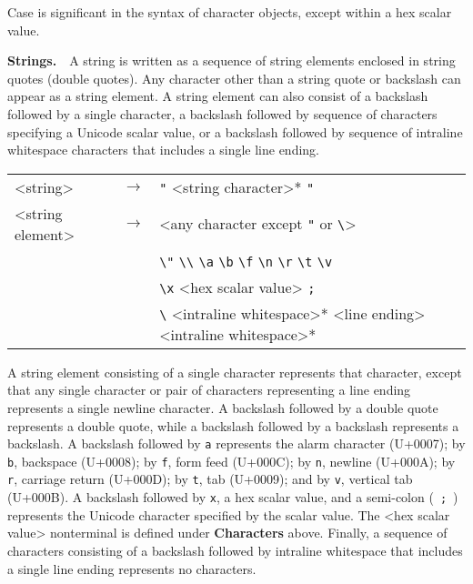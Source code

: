 Case is significant in the syntax of character objects, except within a hex scalar value.


\textbf{Strings\label{grammar_grammar_strings}.}  \label{grammar_s16}A string is written as a sequence of string elements enclosed in string quotes
(double quotes).
Any character other than a string quote or backslash can appear as a
string element.
A string element can also consist of a backslash followed by a single
character, a backslash followed by sequence of characters specifying a
Unicode scalar value, or a backslash followed by sequence of intraline
whitespace characters that includes a single line ending.


  
  
  {\footnotesize
\begin{tabular}[H]{lcl}

\textless{}string\textgreater{} & \(\longrightarrow\) & \texttt{"} \textless{}string character\textgreater{}* \texttt{"} \\

\textless{}string element\textgreater{} & \(\longrightarrow\) & \textless{}any character except \texttt{"} or \texttt{\textbackslash{}}\textgreater{} \\

   & \textbar{} & \texttt{\textbackslash{}"} \textbar{} \texttt{\textbackslash{}\textbackslash{}} \textbar{} \texttt{\textbackslash{}a} \textbar{} \texttt{\textbackslash{}b}
        \textbar{} \texttt{\textbackslash{}f} \textbar{} \texttt{\textbackslash{}n} \textbar{} \texttt{\textbackslash{}r} \textbar{} \texttt{\textbackslash{}t} \textbar{} \texttt{\textbackslash{}v} \\

   & \textbar{} & \texttt{\textbackslash{}x} \textless{}hex scalar value\textgreater{} \texttt{;} \\

   & \textbar{} & \texttt{\textbackslash{}} \textless{}intraline whitespace\textgreater{}* \textless{}line ending\textgreater{} \textless{}intraline whitespace\textgreater{}* \\
\end{tabular}
}


A string element consisting of a single character represents that
character, except that any single character or pair of characters
representing a line ending represents a single newline character.
A backslash followed by a double quote represents a double quote, while
a backslash followed by a backslash represents a backslash.
A backslash followed by
\texttt{a} represents the alarm character (U+0007);
by \texttt{b}, backspace (U+0008);
by \texttt{f}, form feed (U+000C);
by \texttt{n}, newline (U+000A);
by \texttt{r}, carriage return (U+000D);
by \texttt{t}, tab (U+0009); and
by \texttt{v}, vertical tab (U+000B).
A backslash followed by \texttt{x}, a hex scalar value, and a semi-colon
( \texttt{;} ) represents the Unicode character specified by the scalar value.
The \textless{}hex scalar value\textgreater{} nonterminal is defined under \textbf{Characters} above.
Finally, a sequence of characters consisting of a backslash followed by
intraline whitespace that includes a single line ending represents no characters.


